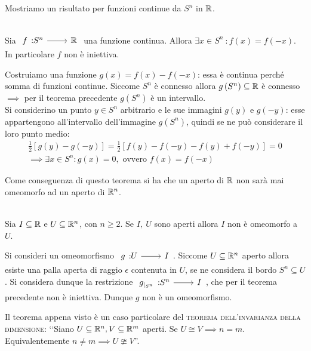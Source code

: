 Mostriamo un risultato per funzioni continue da $S^n$ in $\mathbb{R}$.
\begin{theorema}~{}\\ \label{non iniettività S^n in realset}
	Sia $\funz f {S^n} \realset$ una funzione continua. Allora $\exists x\in S^n \ \colon f(x)=f(-x)$. In particolare $f$ non è iniettiva.
\end{theorema}
\begin{demonstration}
	Costruiamo una funzione $g(x)=f(x)-f(-x)$: essa è continua perché somma di funzioni continue. Siccome $S^n$ è connesso allora $g\left( S^n\right)\subseteq\mathbb{R}$ è connesso $\implies$ per il teorema precedente $g\left(S^n\right)$ è un intervallo.\\
	Si considerino un punto $y\in S^n$ arbitrario e le sue immagini $g(y)$ e $g(-y)$: esse appartengono all'intervallo dell'immagine $g\left( S^n\right)$, quindi se ne può considerare il loro punto medio:
		\begin{gather*}
			\frac{1}{2}\left[ g(y) - g(-y)\right]=\frac{1}{2} \left[ f(y) -f(-y) - f(y) +f(-y) \right]= 0\\
			\implies \exists x\in S^n \colon g(x)=0, \text{ ovvero } f(x)=f(-x)
		\end{gather*}
\end{demonstration}
Come conseguenza di questo teorema si ha che un aperto di $\mathbb{R}$ non sarà mai omeomorfo ad un aperto di $\mathbb{R}^n$.
\begin{theorema}~{}\\ 
Sia $I\subseteq\mathbb{R}$ e $U\subseteq\mathbb{R}^n$, con $n\geq 2$. Se $I,\ U$ sono aperti allora $I$ non è omeomorfo a $U$.	
\end{theorema}	
\begin{demonstration}
	Si consideri un omeomorfismo $\funz g U I$. Siccome $U\subseteq\mathbb{R}^n$ aperto allora esiste una palla aperta di raggio $\epsilon$ contenuta in $U$, se ne considera il bordo $S^n\subseteq U$. Si considera dunque la restrizione $\funz {g_{|_{S^n}}} {S^n} I$, che per il teorema precedente non è iniettiva. Dunque $g$ non è un omeomorfismo.	
\end{demonstration}

\begin{observe}
	Il teorema appena visto è un caso particolare del \textsc{teorema dell'invarianza della dimensione}: ‘‘Siano $U\subseteq\mathbb{R}^n, V\subseteq\mathbb{R}^m$ aperti. Se $U\cong V \implies n=m$. Equivalentemente $n\neq m\implies U\ncong V$''.
\end{observe}
